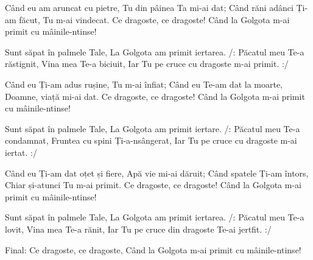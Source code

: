 
\beginverse
Când eu am aruncat cu pietre,
Tu din pâinea Ta mi-ai dat;
Când răni adânci Ți-am făcut,
Tu m-ai vindecat.
Ce dragoste, ce dragoste!
Când la Golgota m-ai primit cu mâinile-ntinse!
\endverse

\beginchorus
Sunt săpat în palmele Tale,
La Golgota am primit iertarea.
/: Păcatul meu Te-a răstignit,
Vina mea Te-a biciuit,
Iar Tu pe cruce cu dragoste m-ai primit. :/
\endchorus

\beginverse
Când eu Ți-am adus rușine,
Tu m-ai înfiat;
Când eu Te-am dat la moarte,
Doamne, viață mi-ai dat.
Ce dragoste, ce dragoste!
Când la Golgota m-ai primit cu mâinile-ntinse!
\endverse

\beginchorus
Sunt săpat în palmele Tale,
La Golgota am primit iertare.
/: Păcatul meu Te-a condamnat,
Fruntea cu spini Ți-a-nsângerat,
Iar Tu pe cruce cu dragoste m-ai iertat. :/
\endchorus

\beginverse
Când eu Ți-am dat oțet și fiere,
Apă vie mi-ai dăruit;
Când spatele Ți-am întors,
Chiar și-atunci Tu m-ai primit.
Ce dragoste, ce dragoste!
Când la Golgota m-ai primit cu mâinile-ntinse!
\endverse

\beginchorus
Sunt săpat în palmele Tale,
La Golgota am primit iertarea.
/: Păcatul meu Te-a lovit,
Vina mea Te-a rănit,
Iar Tu pe cruce din dragoste Te-ai jertfit. :/
\endchorus

\beginverse*
Final: Ce dragoste, ce dragoste,
Când la Golgota m-ai primit cu mâinile-ntinse!
\endverse

\endsong